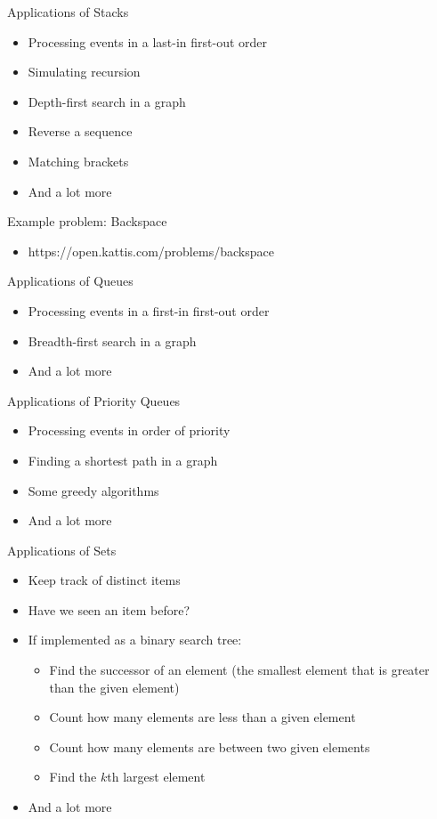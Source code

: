 \documentclass[10pt]{beamer}
\newcommand{\bi}{\begin{itemize}}
\newcommand{\ei}{\end{itemize}}
\begin{document}
\begin{frame}{Applications of Stacks}
    \bi
        \item Processing events in a last-in first-out order
        \item Simulating recursion
        \item Depth-first search in a graph
        \item Reverse a sequence
        \item Matching brackets
        \item And a lot more
    \ei
\end{frame}

\begin{frame}{Example problem: Backspace}
    \bi
        \item https://open.kattis.com/problems/backspace
    \ei
\end{frame}

\begin{frame}{Applications of Queues}
    \bi
        \item Processing events in a first-in first-out order
        \item Breadth-first search in a graph
        \item And a lot more
    \ei
\end{frame}

\begin{frame}{Applications of Priority Queues}
    \bi
        \item Processing events in order of priority
        \item Finding a shortest path in a graph
        \item Some greedy algorithms
        \item And a lot more
    \ei
\end{frame}

\begin{frame}{Applications of Sets}
    \bi
        \item Keep track of distinct items
        \item Have we seen an item before?
        \item If implemented as a binary search tree:
            \bi
        \item Find the successor of an element (the smallest element that is greater than the given element)
        \item Count how many elements are less than a given element
        \item Count how many elements are between two given elements
        \item Find the $k$th largest element
            \ei

        \item And a lot more
    \ei
\end{frame}
\end{document}
